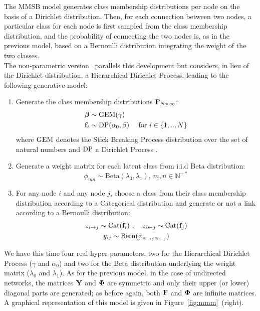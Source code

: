 The MMSB model generates class membership distributions per node on the basis of a Dirichlet distribution. Then, for each connection between two nodes, a particular class for each node is first sampled from the class membership distribution, and the probability of connecting the two nodes is, as in the previous model, based on a Bernoulli distribution integrating the weight of the two classes. 
~\\
The non-parametric version \imb\ parallels this development but considers, in lieu of the Dirichlet distribution, a Hierarchical Dirichlet Process, leading to the following generative model:
%
\begin{enumerate}
\item Generate the class membership distributions $\mathbf{F}_{N \times \infty}$:
   \begin{align}
       \bm{\beta} &\sim \mathrm{GEM}(\gamma) \nonumber \\
    \mathbf{f}_i &\sim \mathrm{DP}(\alpha_0, \beta) \quad\textnormal{ for }  i \in \{1, .., N\} \nonumber
   \end{align}
where $\mathrm{GEM}$ denotes the Stick Breaking Process distribution over the set of natural numbers and $\mathrm{DP}$ a Dirichlet Process  \cite{HDP}.
\item Generate a weight matrix for each latent class from i.i.d Beta distribution:\\
\[ \phi_{mn} \sim \mathrm{Beta}(\lambda_0,\lambda_1), \, m,n \in \mathbb{N}^{+*} \]
\item For any node $i$ and any node $j$, choose a class from their class membership distribution according to a Categorical distribution and generate or not a link according to a Bernoulli distribution:
   \begin{gather*}
    z_{i \rightarrow j} \sim \mbox{Cat}(\mathbf{f}_i) \ , \quad z_{i \leftarrow j} \sim \mbox{Cat}(\mathbf{f}_j) \\
    y_{ij} \sim \mathrm{Bern}(\phi_{z_{i \rightarrow j}z_{i \leftarrow j}})
   \end{gather*}
\end{enumerate}
%
We have this time four real hyper-parameters, two for the Hierarchical Dirichlet Process ($\gamma$ and $\alpha_0$) and two for the Beta distribution underlying the weight matrix ($\lambda_0$ and $\lambda_1$). As for the previous model, in the case of undirected networks, the matrices $\mathbf{Y}$ and $\mathbf{\Phi}$ are symmetric and only their upper (or lower) diagonal parts are generated; as before again, both $\mathbf{F}$ and $\mathbf{\Phi}$ are infinite matrices. A graphical representation of this model is given in Figure~\ref{fig:mmm}~(right).




